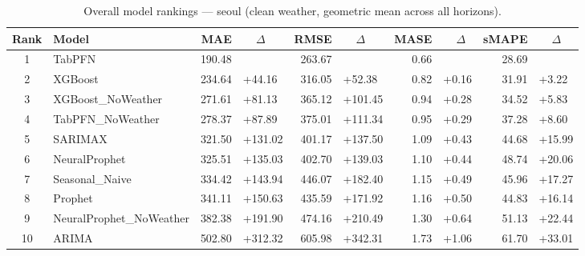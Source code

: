 \begin{table}[ht!]
\centering
\caption{Overall model rankings — seoul (clean weather, geometric mean across all horizons).}
\label{tab:overall_rankings_seoul}
{\small
\setlength{\tabcolsep}{3pt}
\scriptsize
\begin{tabular}{clrlrlrlrl}
\toprule
Rank & Model & MAE & ~~\(\Delta\) & RMSE & ~~\(\Delta\) & MASE & ~~\(\Delta\) & sMAPE & ~~\(\Delta\) \\
\midrule
1 & TabPFN & 190.48 &  & 263.67 &  & 0.66 &  & 28.69 &  \\
2 & XGBoost & 234.64 & +44.16 & 316.05 & +52.38 & 0.82 & +0.16 & 31.91 & +3.22 \\
3 & XGBoost\_NoWeather & 271.61 & +81.13 & 365.12 & +101.45 & 0.94 & +0.28 & 34.52 & +5.83 \\
4 & TabPFN\_NoWeather & 278.37 & +87.89 & 375.01 & +111.34 & 0.95 & +0.29 & 37.28 & +8.60 \\
5 & SARIMAX & 321.50 & +131.02 & 401.17 & +137.50 & 1.09 & +0.43 & 44.68 & +15.99 \\
6 & NeuralProphet & 325.51 & +135.03 & 402.70 & +139.03 & 1.10 & +0.44 & 48.74 & +20.06 \\
7 & Seasonal\_Naive & 334.42 & +143.94 & 446.07 & +182.40 & 1.15 & +0.49 & 45.96 & +17.27 \\
8 & Prophet & 341.11 & +150.63 & 435.59 & +171.92 & 1.16 & +0.50 & 44.83 & +16.14 \\
9 & NeuralProphet\_NoWeather & 382.38 & +191.90 & 474.16 & +210.49 & 1.30 & +0.64 & 51.13 & +22.44 \\
10 & ARIMA & 502.80 & +312.32 & 605.98 & +342.31 & 1.73 & +1.06 & 61.70 & +33.01 \\
\bottomrule
\end{tabular}
}
\end{table}
